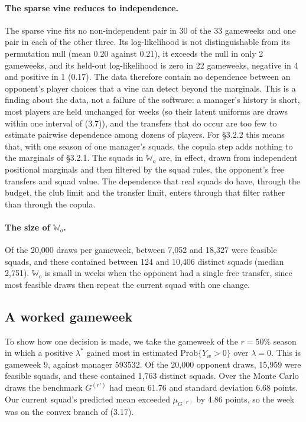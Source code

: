 \documentclass[12pt,oneside,a4paper]{book}
\theoremstyle{definition}
\theoremstyle{remark}
\begin{document}
	\paragraph{The sparse vine reduces to independence.} The sparse vine fits no non-independent
	pair in 30 of the 33 gameweeks and one pair in each of the other three. Its log-likelihood is
	not distinguishable from its permutation null (mean 0.20 against 0.21), it exceeds the null in
	only 2 gameweeks, and its held-out log-likelihood is zero in 22 gameweeks, negative in 4 and
	positive in 1 (0.17). The data therefore contain no dependence between an opponent's player
	choices that a vine can detect beyond the marginals. This is a finding about the data, not a
	failure of the software: a manager's history is short, most players are held unchanged for
	weeks (so their latent uniforms are draws within one interval of (3.7)), and the transfers that
	do occur are too few to estimate pairwise dependence among dozens of players. For §3.2.2 this
	means that, with one season of one manager's squads, the copula step adds nothing to the
	marginals of §3.2.1. The squads in $\mathbb{W}_o$ are, in effect, drawn from independent
	positional marginals and then filtered by the squad rules, the opponent's free transfers and
	squad value. The dependence that real squads do have, through the budget, the club limit and
	the transfer limit, enters through that filter rather than through the copula.

	\paragraph{The size of $\mathbb{W}_o$.} Of the 20{,}000 draws per gameweek, between 7{,}052 and
	18{,}327 were feasible squads, and these contained between 124 and 10{,}406 distinct squads
	(median 2{,}751). $\mathbb{W}_o$ is small in weeks when the opponent had a single free transfer,
	since most feasible draws then repeat the current squad with one change.

	\subsection{A worked gameweek}
	\label{sec:s2-worked}

	To show how one decision is made, we take the gameweek of the $r=50\%$ season in which a
	positive $\lambda^*$ gained most in estimated $\mathrm{Prob}\{Y_w>0\}$ over $\lambda=0$. This is
	gameweek 9, against manager 593532. Of the 20{,}000 opponent draws, 15{,}959 were feasible
	squads, and these contained 1{,}763 distinct squads. Over the Monte Carlo draws the benchmark
	$G^{(r')}$ had mean 61.76 and standard deviation 6.68 points. Our current squad's predicted
	mean exceeded $\mu_{G^{(r')}}$ by 4.86 points, so the week was on the convex branch of (3.17).
\end{document}
